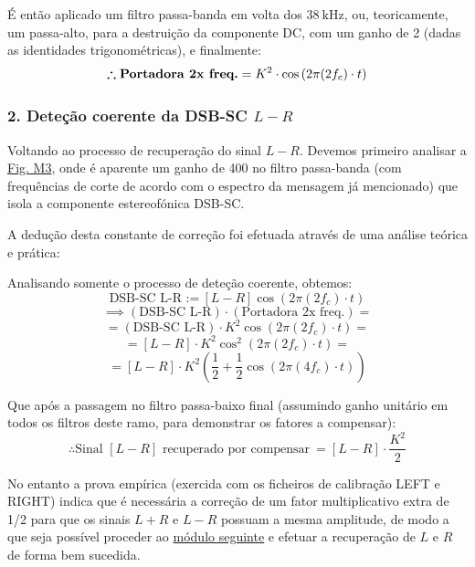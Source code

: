 É então aplicado um filtro passa-banda em volta dos $38\ \text{kHz}$, ou, teoricamente, um passa-alto\footnotemark[1], para a destruição da componente DC, com um ganho de 2 (dadas as identidades trigonométricas), e finalmente:
$$ \pmb{\therefore}  \text{\textbf{Portadora 2x freq.}} = K^2\cdot \cos{(2\pi (2f_c)\cdot t)}$$

\subsubsection{2. Deteção coerente da DSB-SC $L-R$}
\label{subsubsec:coherent}

Voltando ao processo de recuperação do sinal $L-R$. Devemos primeiro analisar a \hyperref[fig:modulo3]{Fig. M3}, onde é aparente um ganho de 400 no filtro passa-banda (com frequências de corte de acordo com o espectro da mensagem já mencionado) que isola a componente estereofónica DSB-SC.

A dedução desta constante de correção foi efetuada através de uma análise teórica e prática:

Analisando somente o processo de deteção coerente, obtemos:
$$\text{DSB-SC L-R :=}\ [L-R]\cos{(2\pi (2f_c)\cdot t)}$$
$$\implies (\text{DSB-SC L-R})\cdot (\text{Portadora 2x freq.})=$$
$$= (\text{DSB-SC L-R})\cdot K^2 \cos{(2\pi (2f_c)\cdot t)} =$$
$$= [L-R]\cdot K^2\cos^2{(2\pi (2f_c)\cdot t)} =$$
$$= [L-R]\cdot K^2\left(\frac{1}{2} + \frac{1}{2}\cos{(2\pi (4f_c)\cdot t)}\right) $$

Que após a passagem no filtro passa-baixo final (assumindo ganho unitário em todos os filtros deste ramo, para demonstrar os fatores a compensar):
$$\therefore \text{Sinal $[L-R]$ recuperado por compensar}\ = [L-R]\cdot \frac{K^2}{2}$$

No entanto a prova empírica (exercida com os ficheiros de calibração LEFT e RIGHT) indica que é necessária a correção de um fator multiplicativo extra de 1/2 para que os sinais $L+R$ e $L-R$ possuam a mesma amplitude, de modo a que seja possível proceder ao \hyperref[subsec:mod4]{módulo seguinte} e efetuar a recuperação de $L$ e $R$ de forma bem sucedida.

\newpage

